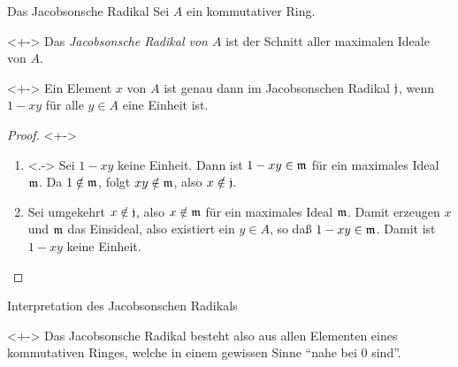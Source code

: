 \begin{frame}{Das Jacobsonsche Radikal}
    Sei \(A\) ein kommutativer Ring.
    \begin{definition}<+->
        Das \emph{Jacobsonsche Radikal von \(A\)} ist der Schnitt aller maximalen 
        Ideale von \(A\).
    \end{definition}
    \begin{proposition}<+->
        Ein Element \(x\) von \(A\) ist genau dann im Jacobsonschen Radikal
        \(\mathfrak{j}\), wenn \(1 - xy\) für alle \(y \in A\) eine Einheit ist.
    \end{proposition}
    \begin{proof}<+->
        \begin{enumerate}[<+->]
        \item<.->
            Sei \(1 - xy\) keine Einheit. Dann ist \(1 - xy \in \mathfrak{m}\) für ein
            maximales Ideal \(\mathfrak{m}\). Da \(1 \notin \mathfrak{m}\), folgt
            \(xy \notin \mathfrak{m}\), also \(x \notin \mathfrak{j}\).
        \item
            Sei umgekehrt \(x \notin \mathfrak{j}\), also \(x \notin \mathfrak{m}\) für ein
            maximales Ideal \(\mathfrak{m}\). Damit erzeugen \(x\) und \(\mathfrak{m}\) das
            Einsideal, also existiert ein \(y \in A\), so daß \(1 - xy \in \mathfrak{m}\).
            Damit ist \(1 - xy\) keine Einheit.
            \qedhere
        \end{enumerate}
    \end{proof}
\end{frame}

\begin{frame}{Interpretation des Jacobsonschen Radikals}
    \begin{visibleenv}<+->
        Das Jacobsonsche Radikal besteht also aus allen Elementen eines kommutativen
        Ringes, welche in einem gewissen Sinne "`nahe bei \(0\) sind"'.
    \end{visibleenv}
\end{frame}

